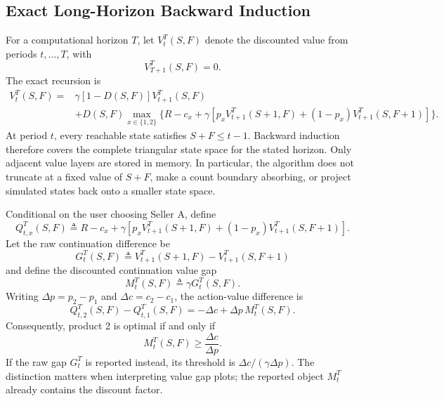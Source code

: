 \documentclass[opre]{informs3}
\begin{document}
\subsection{Exact Long-Horizon Backward Induction}

For a computational horizon $T$, let $V_t^T(S,F)$ denote the discounted value
from periods $t,\ldots,T$, with
\begin{equation}
    V_{T+1}^T(S,F)=0.
    \label{eq:terminal-condition}
\end{equation}
The exact recursion is
\begin{equation}
\begin{aligned}
    V_t^T(S,F)
    ={}&
    \gamma[1-D(S,F)]V_{t+1}^T(S,F)\\
    &+
    D(S,F)
    \max_{x\in\{1,2\}}
    \big\{
        R-c_x
        +\gamma[
            p_xV_{t+1}^T(S+1,F)
            +(1-p_x)V_{t+1}^T(S,F+1)
        ]
    \big\}.
\end{aligned}
\label{eq:discounted-bellman}
\end{equation}
At period $t$, every reachable state satisfies $S+F\leq t-1$. Backward
induction therefore covers the complete triangular state space for the stated
horizon. Only adjacent value layers are stored in memory. In particular, the
algorithm does not truncate at a fixed value of $S+F$, make a count boundary
absorbing, or project simulated states back onto a smaller state space.

Conditional on the user choosing Seller A, define
\begin{equation}
    Q_{t,x}^T(S,F)
    \triangleq
    R-c_x
    +\gamma[
        p_xV_{t+1}^T(S+1,F)
        +(1-p_x)V_{t+1}^T(S,F+1)
    ].
    \label{eq:action-value}
\end{equation}
Let the raw continuation difference be
\begin{equation}
    G_t^T(S,F)
    \triangleq
    V_{t+1}^T(S+1,F)-V_{t+1}^T(S,F+1)
    \label{eq:raw-gap}
\end{equation}
and define the discounted continuation value gap
\begin{equation}
    M_t^T(S,F)
    \triangleq
    \gamma G_t^T(S,F).
    \label{eq:discounted-gap}
\end{equation}
Writing $\Delta p=p_2-p_1$ and $\Delta c=c_2-c_1$, the action-value difference
is
\begin{equation}
    Q_{t,2}^T(S,F)-Q_{t,1}^T(S,F)
    =
    -\Delta c+\Delta p\,M_t^T(S,F).
    \label{eq:q-gap}
\end{equation}
Consequently, product 2 is optimal if and only if
\begin{equation}
    M_t^T(S,F)\geq\frac{\Delta c}{\Delta p}.
    \label{eq:discounted-threshold}
\end{equation}
If the raw gap $G_t^T$ is reported instead, its threshold is
$\Delta c/(\gamma\Delta p)$. The distinction matters when interpreting value
gap plots; the reported object $M_t^T$ already contains the discount factor.
\end{document}
